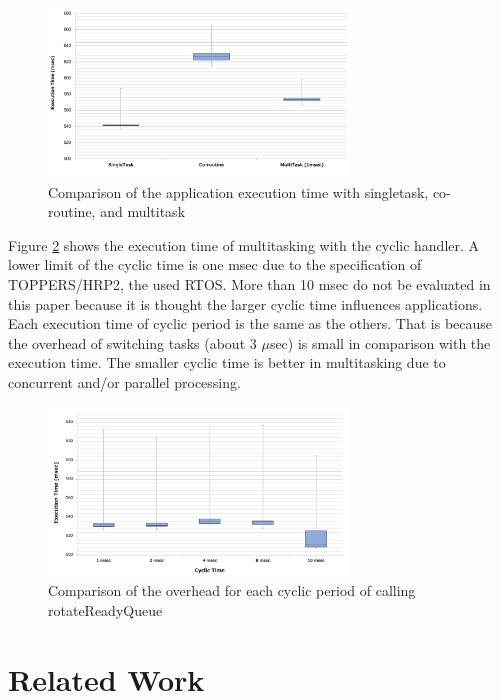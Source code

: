 \documentclass[conference,compsoc]{IEEEtran}
\begin{document}
\begin{figure}[t]
    \centering
    \includegraphics[width=8cm,clip]{figure/comparison_s_c_m.pdf}
    \caption{Comparison of the application execution time with singletask, co-routine, and multitask}
    \label{fig:comparison_s_c_m}
\end{figure}

Figure \ref{fig:comparison_msec} shows the execution time of multitasking with the cyclic handler.
A lower limit of the cyclic time is one msec due to the specification of TOPPERS/HRP2, the used RTOS.
More than 10 msec do not be evaluated in this paper because it is thought the larger cyclic time influences applications.
Each execution time of cyclic period is the same as the others.
That is because the overhead of switching tasks (about 3 $\mu$sec) is small in comparison with the execution time.
The smaller cyclic time is better in multitasking due to concurrent and/or parallel processing.

\begin{figure}[t]
    \centering
    \includegraphics[width=8cm,clip]{figure/comparison_msec.pdf}
    \caption{Comparison of the overhead for each cyclic period of calling rotateReadyQueue}
    \label{fig:comparison_msec}
\end{figure}
 
\section{Related Work}
\label{sec:Related work}
\end{document}
